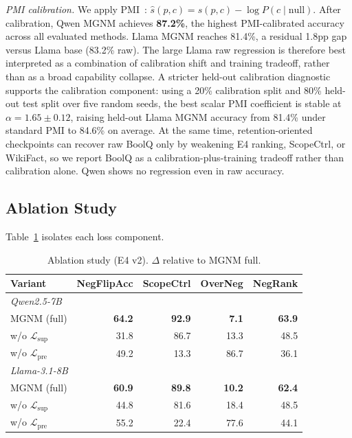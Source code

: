 \documentclass[letterpaper]{article}
\begin{document}
\emph{PMI calibration.}
We apply PMI~\cite{holtzman2021surface}:
$\hat{s}(p, c) = s(p, c) - \log P(c \mid \text{null})$.
After calibration, Qwen MGNM achieves \textbf{87.2\%}, the highest PMI-calibrated
accuracy across all evaluated methods.
Llama MGNM reaches 81.4\%, a residual 1.8pp gap versus Llama base (83.2\% raw).
The large Llama raw regression is therefore best interpreted as a combination
of calibration shift and training tradeoff, rather than as a broad capability
collapse. A stricter held-out calibration diagnostic supports the calibration
component: using a 20\% calibration split
and 80\% held-out test split over five random seeds, the best scalar PMI
coefficient is stable at $\alpha = 1.65 \pm 0.12$, raising held-out Llama MGNM
accuracy from 81.4\% under standard PMI to 84.6\% on average. At the same time,
retention-oriented checkpoints can recover raw BoolQ only by weakening E4
ranking, ScopeCtrl, or WikiFact, so we report BoolQ as a calibration-plus-training
tradeoff rather than calibration alone. Qwen shows no regression
even in raw accuracy.

\subsection{Ablation Study}

Table~\ref{tab:ablation} isolates each loss component.

\begin{table}[t]
\centering
\small
\caption{Ablation study (E4 v2). $\Delta$ relative to MGNM full.}
\label{tab:ablation}
\setlength{\tabcolsep}{4pt}
\begin{tabular}{lrrrr}
\toprule
Variant & NegFlipAcc & ScopeCtrl & OverNeg & NegRank \\
\midrule
\multicolumn{5}{l}{\textit{Qwen2.5-7B}} \\
MGNM (full) & \textbf{64.2} & \textbf{92.9} & \phantom{0}\textbf{7.1} & \textbf{63.9} \\
w/o $\mathcal{L}_\text{sup}$ & 31.8 & 86.7 & 13.3 & 48.5 \\
w/o $\mathcal{L}_\text{pre}$ & 49.2 & 13.3 & 86.7 & 36.1 \\
\midrule
\multicolumn{5}{l}{\textit{Llama-3.1-8B}} \\
MGNM (full) & \textbf{60.9} & \textbf{89.8} & \phantom{0}\textbf{10.2} & \textbf{62.4} \\
w/o $\mathcal{L}_\text{sup}$ & 44.8 & 81.6 & 18.4 & 48.5 \\
w/o $\mathcal{L}_\text{pre}$ & 55.2 & 22.4 & 77.6 & 44.1 \\
\bottomrule
\end{tabular}
\end{table}
\end{document}
